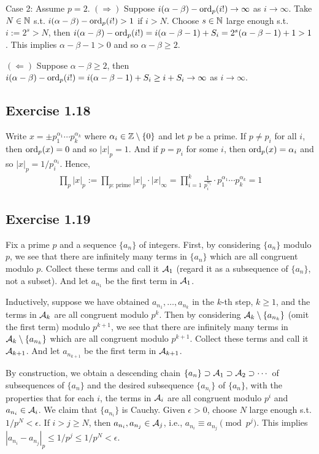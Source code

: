 \documentclass[../Koblitz.tex]{subfiles}
\begin{document}
Case 2: Assume $p=2$. $(\Rightarrow)$ Suppose $i(\alpha-\beta)-\operatorname{ord}_p(i!)\to\infty$ as $i\to\infty$. Take $N\in\mathbb{N}$ s.t. $i(\alpha-\beta)-\operatorname{ord}_p(i!) > 1$ if $i>N$. Choose $s\in\mathbb{N}$ large enough s.t. $i:=2^s>N$, then $i(\alpha-\beta)-\operatorname{ord}_p(i!) = i(\alpha-\beta-1)+S_i = 2^s(\alpha-\beta-1) +1 >1$. This implies $\alpha-\beta-1>0$ and so $\alpha-\beta\geq 2$.

$(\Leftarrow)$ Suppose $\alpha-\beta\geq 2$, then $i(\alpha-\beta)-\operatorname{ord}_p(i!) = i(\alpha-\beta-1)+S_i \geq i+S_i \to \infty$ as $i\to\infty$.

\subsection*{Exercise 1.18}

Write $x=\pm p_1^{\alpha_1}\cdots p_k^{\alpha_k}$ where $\alpha_i\in\mathbb{Z}\setminus\{0\}$ and let $p$ be a prime. If $p\neq p_i$ for all $i$, then $\operatorname{ord}_p(x)=0$ and so $|x|_p=1$. And if $p=p_i$ for some $i$, then $\operatorname{ord}_p(x)=\alpha_i$ and so $|x|_p=1/p_i^{\alpha_i}$. Hence,
\begin{align*}
\prod_p |x|_p := \prod_{p\text{: prime}} |x|_p \cdot |x|_\infty = \prod_{i=1}^k \frac{1}{p_i^{\alpha_i}} \cdot p_1^{\alpha_1}\cdots p_k^{\alpha_k} = 1
\end{align*}

\subsection*{Exercise 1.19}

Fix a prime $p$ and a sequence $\{a_n\}$ of integers. First, by considering $\{a_n\}$ modulo $p$, we see that there are infinitely many terms in $\{a_n\}$ which are all congruent modulo $p$. Collect these terms and call it $\mathcal{A}_1$ (regard it as a subsequence of $\{a_n\}$, not a subset). And let $a_{n_1}$ be the first term in $\mathcal{A}_1$.

Inductively, suppose we have obtained $a_{n_1},\ldots,a_{n_k}$ in the $k$-th step, $k\geq1$, and the terms in $\mathcal{A}_k$ are all congruent modulo $p^k$. Then by considering $\mathcal{A}_k\setminus\{a_{n_k}\}$ (omit the first term) modulo $p^{k+1}$, we see that there are infinitely many terms in $\mathcal{A}_k\setminus\{a_{n_k}\}$ which are all congruent modulo $p^{k+1}$. Collect these terms and call it $\mathcal{A}_{k+1}$. And let $a_{n_{k+1}}$ be the first term in $\mathcal{A}_{k+1}$.

By construction, we obtain a descending chain $\{a_n\}\supset\mathcal{A}_1\supset\mathcal{A}_2\supset\cdots$ of subsequences of $\{a_n\}$ and the desired subsequence $\{a_{n_i}\}$ of $\{a_n\}$, with the properties that for each $i$, the terms in $\mathcal{A}_i$ are all congruent modulo $p^i$ and $a_{n_i}\in\mathcal{A}_i$. We claim that $\{a_{n_i}\}$ is Cauchy. Given $\epsilon>0$, choose $N$ large enough s.t. $1/p^N<\epsilon$. If $i>j\geq N$, then $a_{n_i},a_{n_j}\in\mathcal{A}_j$, i.e., $a_{n_i}\equiv a_{n_j} \pmod{p^j}$. This implies $|a_{n_i}-a_{n_j}|_p \leq 1/p^j \leq 1/p^N < \epsilon$.
\end{document}
